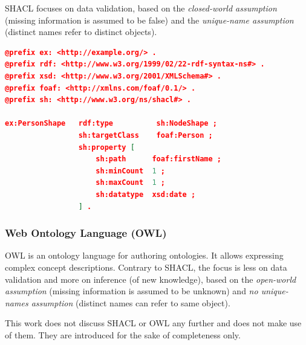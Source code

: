 SHACL focuses on data validation, based on the \textit{closed-world assumption} (missing information is assumed to be false) and the \textit{unique-name assumption} (distinct names refer to distinct objects).\cite{steffen_staab_lecture_slides}

\begin{lstlisting}[language=json,basicstyle=\scriptsize,firstnumber=1,caption={SHACL example shape},captionpos=b,label={lst:shacl_example}]
@prefix ex: <http://example.org/> .
@prefix rdf: <http://www.w3.org/1999/02/22-rdf-syntax-ns#> .
@prefix xsd: <http://www.w3.org/2001/XMLSchema#> .
@prefix foaf: <http://xmlns.com/foaf/0.1/> .
@prefix sh: <http://www.w3.org/ns/shacl#> .

ex:PersonShape   rdf:type          sh:NodeShape ;
                 sh:targetClass    foaf:Person ;
                 sh:property [
                     sh:path      foaf:firstName ;
                     sh:minCount  1 ;
                     sh:maxCount  1 ;
                     sh:datatype  xsd:date ;
                 ] .
\end{lstlisting}



\subsubsection{Web Ontology Language (OWL)}
OWL \cite{OWL} is an ontology language for authoring ontologies.
It allows expressing complex concept descriptions.
Contrary to SHACL, the focus is less on data validation and more on inference (of new knowledge), based on the \textit{open-world assumption} (missing information is assumed to be unknown) and \textit{no unique-names assumption} (distinct names can refer to same object).\cite{steffen_staab_lecture_slides}

This work does not discuss SHACL or OWL any further and does not make use of them. 
They are introduced for the sake of completeness only.



